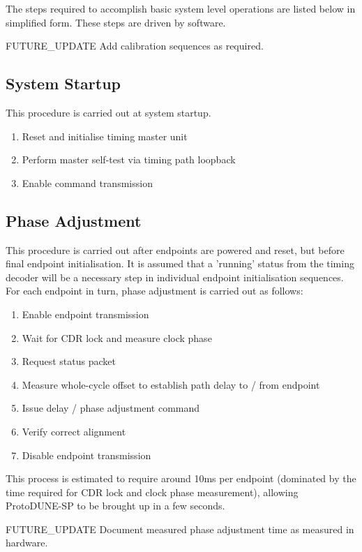 \documentclass[a4paper,11pt]{article}
\begin{document}
The steps required to accomplish basic system level operations are listed below in simplified form. These steps are driven by software.

{\color{red}FUTURE\_UPDATE} Add calibration sequences as required.

\subsection{System Startup}

This procedure is carried out at system startup.

\begin{enumerate}
	\item Reset and initialise timing master unit
	\item Perform master self-test via timing path loopback
	\item Enable command transmission
\end{enumerate}

\subsection{Phase Adjustment}

This procedure is carried out after endpoints are powered and reset, but before final endpoint initialisation. It is assumed that a 'running' status from the timing decoder will be a necessary step in individual endpoint initialisation sequences. For each endpoint in turn, phase adjustment is carried out as follows:

\begin{enumerate}
	\item Enable endpoint transmission
	\item Wait for CDR lock and measure clock phase
	\item Request status packet
	\item Measure whole-cycle offset to establish path delay to / from endpoint
	\item Issue delay / phase adjustment command
	\item Verify correct alignment
	\item Disable endpoint transmission
\end{enumerate}

This process is estimated to require around 10ms per endpoint (dominated by the time required for CDR lock and clock phase measurement), allowing ProtoDUNE-SP to be brought up in a few seconds.

{\color{red}FUTURE\_UPDATE} Document measured phase adjustment time as measured in hardware.
\end{document}

